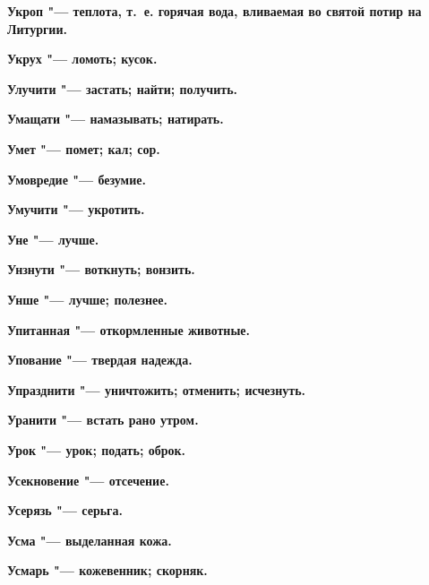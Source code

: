 \begin{multicols}{2}
\bfseries Укроп\normalfont{} "--- теплота, т.~е. горячая вода, вливаемая во святой потир на Литургии. 




\bfseries Укрух\normalfont{} "--- ломоть; кусок. 




\bfseries Улучити\normalfont{} "--- застать; найти; получить. 




\bfseries Умащати\normalfont{} "--- намазывать; натирать. 




\bfseries Умет\normalfont{} "--- помет; кал; сор. 




\bfseries Умовредие\normalfont{} "--- безумие. 




\bfseries Умучити\normalfont{} "--- укротить. 




\bfseries Уне\normalfont{} "--- лучше. 




\bfseries Унзнути\normalfont{} "--- воткнуть; вонзить. 




\bfseries Унше\normalfont{} "--- лучше; полезнее. 




\bfseries Упитанная\normalfont{} "--- откормленные животные. 




\bfseries Упование\normalfont{} "--- твердая надежда. 




\bfseries Упразднити\normalfont{} "--- уничтожить; отменить; исчезнуть. 




\bfseries Уранити\normalfont{} "--- встать рано утром. 




\bfseries Урок\normalfont{} "--- урок; подать; оброк. 




\bfseries Усекновение\normalfont{} "--- отсечение. 




\bfseries Усерязь\normalfont{} "--- серьга. 




\bfseries Усма\normalfont{} "--- выделанная кожа. 




\bfseries Усмарь\normalfont{} "--- кожевенник; скорняк. 





\end{multicols}
